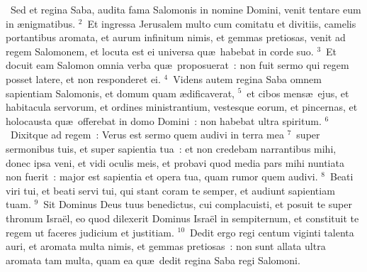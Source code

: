 ~Sed et regina Saba, audita fama Salomonis in nomine Domini, venit tentare eum in \ae nigmatibus.
${}^{2}$~Et ingressa Jerusalem multo cum comitatu et divitiis, camelis portantibus aromata, et aurum infinitum nimis, et gemmas pretiosas, venit ad regem Salomonem, et locuta est ei universa qu\ae\ habebat in corde suo.
${}^{3}$~Et docuit eam Salomon omnia verba qu\ae\ proposuerat~: non fuit sermo qui regem posset latere, et non responderet ei.
${}^{4}$~Videns autem regina Saba omnem sapientiam Salomonis, et domum quam \ae dificaverat,
${}^{5}$~et cibos mens\ae\ ejus, et habitacula servorum, et ordines ministrantium, vestesque eorum, et pincernas, et holocausta qu\ae\ offerebat in domo Domini~: non habebat ultra spiritum.
${}^{6}$~Dixitque ad regem~: Verus est sermo quem audivi in terra mea
${}^{7}$~super sermonibus tuis, et super sapientia tua~: et non credebam narrantibus mihi, donec ipsa veni, et vidi oculis meis, et probavi quod media pars mihi nuntiata non fuerit~: major est sapientia et opera tua, quam rumor quem audivi.
${}^{8}$~Beati viri tui, et beati servi tui, qui stant coram te semper, et audiunt sapientiam tuam.
${}^{9}$~Sit Dominus Deus tuus benedictus, cui complacuisti, et posuit te super thronum Isra\"el, eo quod dilexerit Dominus Isra\"el in sempiternum, et constituit te regem ut faceres judicium et justitiam.
${}^{10}$~Dedit ergo regi centum viginti talenta auri, et aromata multa nimis, et gemmas pretiosas~: non sunt allata ultra aromata tam multa, quam ea qu\ae\ dedit regina Saba regi Salomoni.


